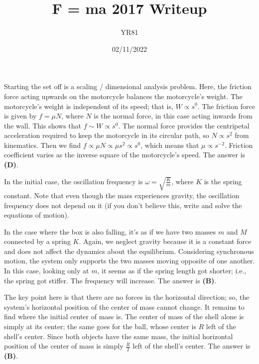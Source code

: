 \documentclass[12pt]{article}
\title{F = ma 2017 Writeup}
\author{YR81}
\date{02/11/2022}
\begin{document}
\maketitle



Starting the set off is a scaling / dimensional analysis problem. Here, the friction force acting upwards on the motorcycle balances the motorcycle's weight. The motorcycle's weight is independent of its speed; that is, $W \propto s^0$. The friction force is given by $f = \mu N$, where $N$ is the normal force, in this case acting inwards from the wall. This shows that $f \sim W \propto s^0$. The normal force provides the centripetal acceleration required to keep the motorcycle in its circular path, so $N \propto s^2$ from kinematics. Then we find $f \propto \mu N \propto \mu s^2 \propto s^0$, which means that $\mu \propto s^{-2}$. Friction coefficient varies as the inverse square of the motorcycle's speed. The answer is \textbf{(D)}.


\vspace{2 \baselineskip}



In the initial case, the oscillation frequency is $\omega = \sqrt{\frac{K}{m}}$, where $K$ is the spring constant. Note that even though the mass experiences gravity, the oscillation frequency does not depend on it (if you don't believe this, write and solve the equations of motion).

In the case where the box is also falling, it's as if we have two masses $m$ and $M$ connected by a spring $K$. Again, we neglect gravity because it is a constant force and does not affect the dynamics about the equilibrium. Considering synchronous motion, the system only supports the two masses moving opposite of one another. In this case, looking only at $m$, it seems as if the spring length got shorter; i.e., the spring got stiffer. The frequency will increase. The answer is \textbf{(B)}.


\vspace{2 \baselineskip}



The key point here is that there are no forces in the horizontal direction; so, the system's horizontal position of the center of mass cannot change. It remains to find where the initial center of mass is. The center of mass of the shell alone is simply at its center; the same goes for the ball, whose center is $R$ left of the shell's center. Since both objects have the same mass, the initial horizontal position of the center of mass is simply $\frac{R}{2}$ left of the shell's center. The answer is \textbf{(B)}.
\end{document}
